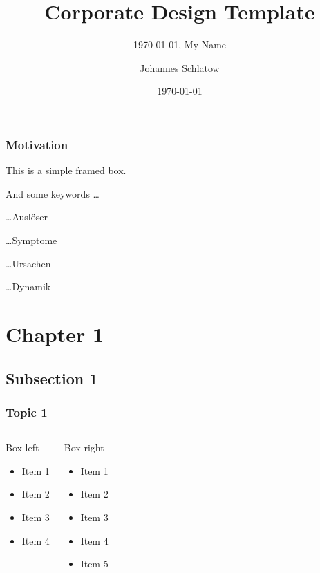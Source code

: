\documentclass[
	ngerman,
	xcolor=dvipsnames,
	11pt
	]{beamer}
\title[ShortTitle]{Corporate Design Template}
\author{Johannes Schlatow}
\institute{}
\date{\today}
\subtitle{\today , My Name}
\newenvironment{annot}{\begin{block}{}}{\end{block}}
\begin{document}
\begin{frame}[t,plain]
	\titlepage
\end{frame}

\begin{frame}
	\frametitle{Motivation}
\begin{annot}
	This is a simple framed box.
\end{annot}

And some keywords \ldots
\begin{description}
	\item \ldots Auslöser
	\item \ldots Symptome
	\item \ldots Ursachen
	\item \ldots Dynamik
\end{description}
\end{frame}

\section{Chapter 1}
\subsection{Subsection 1}
\begin{frame}
	\frametitle{Topic 1}

	\begin{columns}[t]
		\begin{block}{Box left}
			\begin{itemize}
				\item Item 1
				\item Item 2
				\item Item 3
				\item Item 4
			\end{itemize}
		\end{block}
		\pause

		\begin{block}{Box right}
			\begin{itemize}
				\item Item 1
				\item Item 2
				\item Item 3
				\item Item 4
				\item Item 5
			\end{itemize}
		\end{block}
	\end{columns}
\end{frame}
\end{document}
